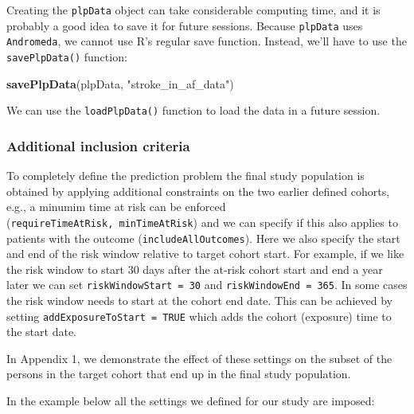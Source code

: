 \documentclass[
]{article}
\newenvironment{Shaded}{\begin{snugshade}}{\end{snugshade}}
\newcommand{\FunctionTok}[1]{\textcolor[rgb]{0.13,0.29,0.53}{\textbf{#1}}}
\newcommand{\NormalTok}[1]{#1}
\newcommand{\StringTok}[1]{\textcolor[rgb]{0.31,0.60,0.02}{#1}}
\begin{document}
Creating the \texttt{plpData} object can take considerable computing
time, and it is probably a good idea to save it for future sessions.
Because \texttt{plpData} uses \texttt{Andromeda}, we cannot use R's
regular save function. Instead, we'll have to use the
\texttt{savePlpData()} function:

\begin{Shaded}
\begin{Highlighting}[]
  \FunctionTok{savePlpData}\NormalTok{(plpData, }\StringTok{"stroke\_in\_af\_data"}\NormalTok{)}
\end{Highlighting}
\end{Shaded}

We can use the \texttt{loadPlpData()} function to load the data in a
future session.

\hypertarget{additional-inclusion-criteria}{%
\subsubsection{Additional inclusion
criteria}\label{additional-inclusion-criteria}}

To completely define the prediction problem the final study population
is obtained by applying additional constraints on the two earlier
defined cohorts, e.g., a minumim time at risk can be enforced
(\texttt{requireTimeAtRisk,\ minTimeAtRisk}) and we can specify if this
also applies to patients with the outcome (\texttt{includeAllOutcomes}).
Here we also specify the start and end of the risk window relative to
target cohort start. For example, if we like the risk window to start 30
days after the at-risk cohort start and end a year later we can set
\texttt{riskWindowStart\ =\ 30} and \texttt{riskWindowEnd\ =\ 365}. In
some cases the risk window needs to start at the cohort end date. This
can be achieved by setting \texttt{addExposureToStart\ =\ TRUE} which
adds the cohort (exposure) time to the start date.

In Appendix 1, we demonstrate the effect of these settings on the subset
of the persons in the target cohort that end up in the final study
population.

In the example below all the settings we defined for our study are
imposed:
\end{document}
